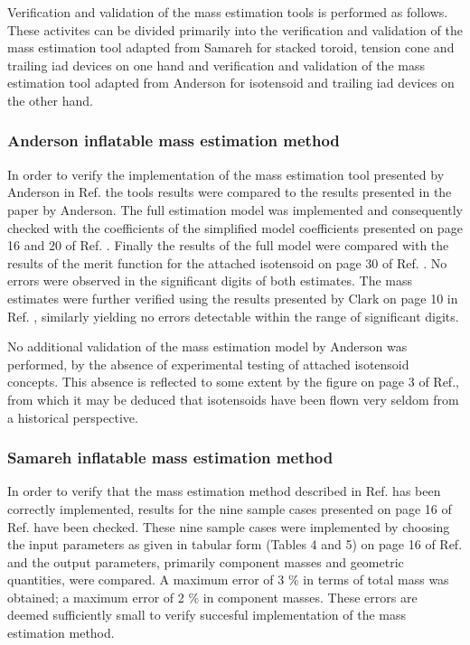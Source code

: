 Verification and validation of the mass estimation tools is performed as follows. These activites can be divided primarily into the verification and validation of the mass estimation tool adapted from Samareh \cite{Samareh2011} for stacked toroid, tension cone and trailing \gls{iad} devices on one hand and verification and validation of the mass estimation tool adapted from Anderson \cite{Anderson1969} for isotensoid and trailing \gls{iad} devices on the other hand. 

\subsubsection{Anderson inflatable mass estimation method}
In order to verify the implementation of the mass estimation tool presented by Anderson in Ref. \cite{Anderson1969} the tools results were compared to the results presented in the paper by Anderson. The full estimation model was implemented and consequently checked with the coefficients of the simplified model coefficients presented on page 16 and 20 of Ref. \cite{Anderson1969}. Finally the results of the full model were compared with the results of the merit function for the attached isotensoid on page 30 of Ref. \cite{Anderson1969}. No errors were observed in the significant digits of both estimates. The mass estimates were further verified using the results presented by Clark on page 10 in Ref. \cite{Clark2009}, similarly yielding no errors detectable within the range of significant digits.

No additional validation of the mass estimation model by Anderson \cite{Anderson1969} was performed, by the absence of experimental testing of attached isotensoid concepts. This absence is reflected to some extent by the figure on page 3 of Ref.\cite{Smith2010}, from which it may be deduced that isotensoids have been flown very seldom from a historical perspective.

\subsubsection{Samareh inflatable mass estimation method}
In order to verify that the mass estimation method described in Ref.\cite{Samareh2011} has been correctly implemented, results for the nine sample cases presented on page 16 of Ref.\cite{Samareh2011} have been checked. These nine sample cases were implemented by choosing the input parameters as given in tabular form (Tables 4 and 5) on page 16 of Ref.\cite{Samareh2011} and the output parameters, primarily component masses and geometric quantities, were compared. A maximum error of 3 $\%$ in terms of total mass was obtained; a maximum error of 2 $\%$ in component masses. These errors are deemed sufficiently small to verify succesful implementation of the mass estimation method.

